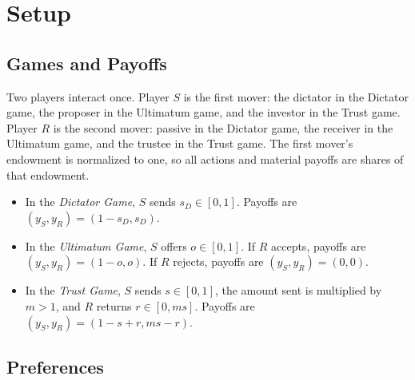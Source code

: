 \documentclass[11pt]{article}
\theoremstyle{plain}
\theoremstyle{remark}
\begin{document}
\setcounter{section}{0}
\setcounter{equation}{0}
\setcounter{proposition}{0}
\setcounter{lemma}{0}
\setcounter{corollary}{0}
\setcounter{assumption}{0}
\setcounter{remark}{0}
\setcounter{table}{0}
\setcounter{figure}{0}
\renewcommand{\thesection}{II.\arabic{section}}
\renewcommand{\theequation}{II.\arabic{equation}}
\renewcommand{\theproposition}{II.\arabic{proposition}}
\renewcommand{\thelemma}{II.\arabic{lemma}}
\renewcommand{\thecorollary}{II.\arabic{corollary}}
\renewcommand{\theassumption}{II.\arabic{assumption}}
\renewcommand{\theremark}{II.\arabic{remark}}
\renewcommand{\thetable}{II.\arabic{table}}
\renewcommand{\thefigure}{II.\arabic{figure}}


\section{Setup}
\label{sec:setup}

\subsection{Games and Payoffs}

Two players interact once.  Player $S$ is the first mover: the dictator in the Dictator game, the proposer in the Ultimatum game, and the investor in the Trust game.  Player $R$ is the second mover: passive in the Dictator game, the receiver in the Ultimatum game, and the trustee in the Trust game.  The first mover's endowment is normalized to one, so all actions and material payoffs are shares of that endowment.
\begin{itemize}[topsep=2pt,itemsep=2pt]
\item In the \emph{Dictator Game}, $S$ sends $s_D\in[0,1]$.  Payoffs are $(y_S,y_R)=(1-s_D,s_D)$.
\item In the \emph{Ultimatum Game}, $S$ offers $o\in[0,1]$.  If $R$ accepts, payoffs are $(y_S,y_R)=(1-o,o)$.  If $R$ rejects, payoffs are $(y_S,y_R)=(0,0)$.
\item In the \emph{Trust Game}, $S$ sends $s\in[0,1]$, the amount sent is multiplied by $m>1$, and $R$ returns $r\in[0,ms]$.  Payoffs are $(y_S,y_R)=(1-s+r,ms-r)$.
\end{itemize}

\subsection{Preferences}
\end{document}

